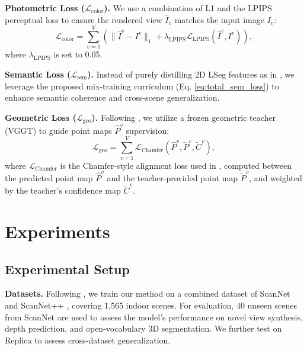\documentclass[runningheads]{llncs}
\begin{document}
\noindent
\textbf{Photometric Loss ($\mathcal{L}_{\text{color}}$).} 
We use a combination of L1 and the LPIPS perceptual loss \cite{lpips} to ensure the rendered view $\hat{I}_{v}$ matches the input image $I_{v}$:  
\begin{equation}
\mathcal{L}_{\text{color}} = \sum_{v=1}^{V} (\| \hat{I}^{v} - I^{v} \|_{1} + \lambda_{\text{LPIPS}}\mathcal{L}_{\text{LPIPS}}(\hat{I}^{v}, I^{v})), 
\end{equation} 
where $ \lambda_{\text{LPIPS}} $ is set to 0.05. 


\noindent
\textbf{Semantic Loss ($\mathcal{L}_{\text{sem}}$).} 
Instead of purely distilling 2D LSeg features as in \cite{lsm,uni3r}, we leverage the proposed mix-training curriculum (Eq. \ref{eq:total_sem_loss}) to enhance semantic coherence and cross-scene generalization. 


\noindent
\textbf{Geometric Loss ($\mathcal{L}_{\text{geo}}$).} 
Following \cite{uni3r}, we utilize a frozen geometric teacher (VGGT) \cite{vggt} to guide point maps $\hat{P}^{v}$ supervision: 
\begin{equation}
\mathcal{L}_{\text{geo}} = \sum_{v=1}^{V}\mathcal{L}_{\text{Chamfer}}\!\left(\hat{P}^{v}, \tilde{P}^{v}, \tilde{C}^{v}\right),
\end{equation}
where $\mathcal{L}_{\text{Chamfer}}$ is the Chamfer-style alignment loss used in \cite{uni3r}, computed between the predicted point map $\hat{P}^{v}$ and the teacher-provided point map $\tilde{P}^{v}$, and weighted by the teacher’s confidence map $\tilde{C}^{v}$.





\section{Experiments}  \label{sec:experiment}
\subsection{Experimental Setup}
\textbf{Datasets.} 
Following \cite{lsm,spatialsplat,uni3r}, we train our method on a combined dataset of ScanNet \cite{scannet} and ScanNet++ \cite{scannetpp}, covering 1,565 indoor scenes. 
For evaluation, 40 unseen scenes from ScanNet are used to assess the model’s performance on novel view synthesis, depth prediction, and open-vocabulary 3D segmentation. 
We further test on Replica \cite{replica} to assess cross-dataset generalization.
\end{document}
